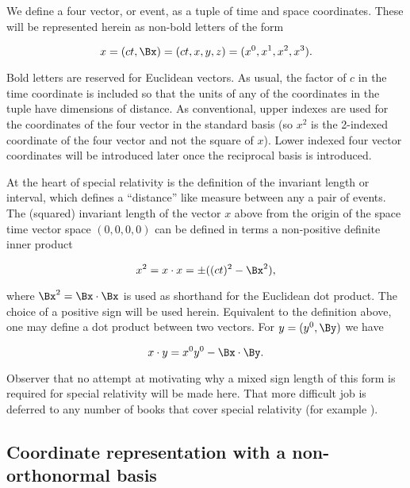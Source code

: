 We define a four vector, or event, as a tuple of time and space coordinates.  These will be represented herein as non-bold letters of the form

\begin{equation}\label{eqn:grahamSchmidtLorentz:10}
x = (c t, \Bx) = ( c t, x, y, z ) = ( x^0, x^1, x^2, x^3 ).
\end{equation}

Bold letters are reserved for Euclidean vectors.  As usual, the factor of $c$ in the time coordinate is included so that the units of any of the coordinates in the tuple have dimensions of distance.  As conventional, upper indexes are used for the coordinates of the four vector in the standard basis (so $x^2$ is the 2-indexed coordinate of the four vector and not the square of $x$).  Lower indexed four vector coordinates will be introduced later once the reciprocal basis is introduced.

At the heart of special relativity is the definition of the invariant length or interval, which defines a ``distance'' like measure between any a pair of events.  The (squared) invariant length of the vector $x$ above from the origin of the space time vector space $(0, 0, 0, 0)$ can be defined in terms a non-positive definite inner product

\begin{equation}\label{eqn:grahamSchmidtLorentz:30}
x^2 = x \cdot x = \pm ((c t)^2 - \Bx^2),
\end{equation}

where $\Bx^2 = \Bx \cdot \Bx$ is used as shorthand for the Euclidean dot product.  The choice of a positive sign will be used herein.  Equivalent to the definition above, one may define a dot product between two vectors.  For $y = (y^0, \By)$ we have

\begin{equation}\label{eqn:grahamSchmidtLorentz:50}
x \cdot y = x^0 y^0 - \Bx \cdot \By.
\end{equation}

Observer that no attempt at motivating why a mixed sign length of this form is required for special relativity will be made here.  That more difficult job is deferred to any number of books that cover special relativity (for example \cite{landau1980classical}).

\subsection{Coordinate representation with a non-orthonormal basis}

